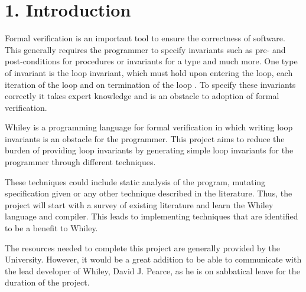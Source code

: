 \documentclass[11pt, a4paper, twoside, openright]{report}
\begin{document}
\section*{1. Introduction}

%
%

Formal verification is an important tool to ensure the correctness of software.
This generally requires the programmer to specify invariants such as
pre- and post-conditions for procedures or invariants for a type and much more.
One type of invariant is the loop invariant,
which must hold upon entering the loop, each iteration of the loop 
and on termination of the loop \cite{invarints-classifiction}.
To specify these invariants correctly it takes expert knowledge and is an obstacle
to adoption of formal verification.

Whiley is a programming language for formal verification in
which writing loop invariants is an obstacle for the programmer.
This project aims to reduce the burden of providing loop invariants by generating
simple loop invariants for the programmer through different techniques.

These techniques could include static analysis of the program, mutating specification
given or any other technique described in the literature. Thus, the project
will start with a survey of existing literature and learn the Whiley language
and compiler. This leads to implementing techniques that are identified to be a
benefit to Whiley.

The resources needed to complete this project are generally provided by the University.
However, it would be a great addition to be able to communicate with the lead developer
of Whiley, David J. Pearce, as he is on sabbatical leave for the duration
of the project.
\end{document}
